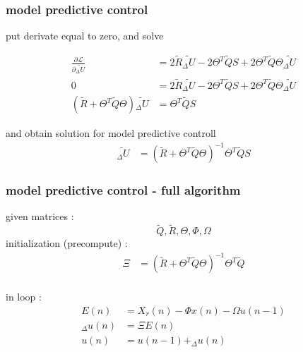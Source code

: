 \documentclass{beamer}
\begin{document}
\begin{frame}
  
  \frametitle{\bf model predictive control}

  put derivate equal to zero, and solve

  \begin{align*}
    \frac{\partial \mathcal{L}}{\partial {\tilde{_\Delta U}}} & = 2 \tilde{R} \tilde{_\Delta U} - 2\Theta^T\tilde{Q}S + 2\Theta^T\tilde{Q}\Theta\tilde{_\Delta U} \\
    0 &= 2 \tilde{R} \tilde{_\Delta U} - 2\Theta^T\tilde{Q}S + 2\Theta^T\tilde{Q}\Theta\tilde{_\Delta U} \\
    (\tilde{R} + \Theta^T\tilde{Q}\Theta)\tilde{_\Delta U}  &= \Theta^T\tilde{Q}S 
  \end{align*}  

  and obtain solution for model predictive controll
  \begin{align*}
    \tilde{_\Delta U} &= (\tilde{R} + \Theta^T\tilde{Q}\Theta)^{-1} \Theta^T\tilde{Q}S
  \end{align*} 

\end{frame}



\begin{frame}
  
  \frametitle{\bf model predictive control - full algorithm}
  given matrices : $$\tilde{Q}, \tilde{R}, \Theta, \Phi, \Omega$$
  initialization (precompute) :
  \begin{align*}
  \Xi &= (\tilde{R} + \Theta^T\tilde{Q}\Theta)^{-1} \Theta^T\tilde{Q} \\
  \end{align*}
  
  in loop :
  \begin{align*}
    E(n) &= X_r(n) - \Phi x(n) - \Omega u(n-1) \\
    _\Delta u(n) &= \Xi E(n) \\
    u(n) &= u(n-1) + _\Delta u(n)
  \end{align*}
\end{frame}
\end{document}
